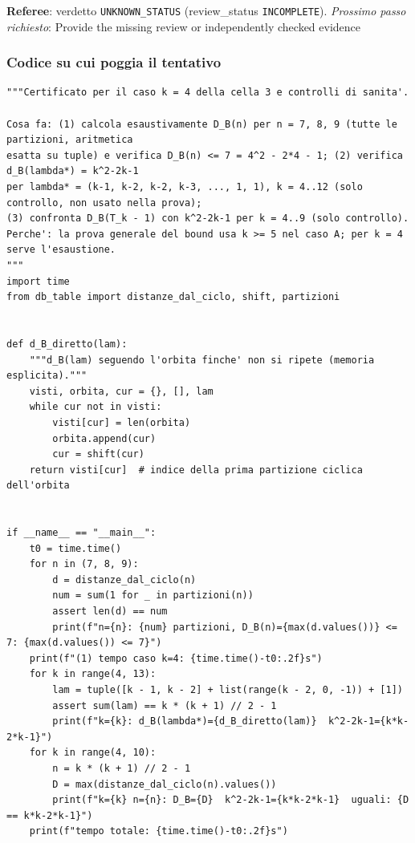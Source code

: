 \documentclass[11pt,a4paper]{article}
\begin{document}
\begin{description}
\textbf{Referee}: verdetto \texttt{UNKNOWN\_STATUS} (review\_status \texttt{INCOMPLETE}).
\emph{Prossimo passo richiesto}: Provide the missing review or independently checked evidence
\end{description}

\subsubsection{Codice su cui poggia il tentativo}
\begin{lstlisting}[caption={attempt\_001 code\_1 [python, rigore exact] — Certificato esaustivo per il caso k=4 (n = 7, 8, 9: tutte le 15+22+30 partizioni, d\_B calc — verdetto del Referee: UNKNOWN\_STATUS}]
"""Certificato per il caso k = 4 della cella 3 e controlli di sanita'.

Cosa fa: (1) calcola esaustivamente D_B(n) per n = 7, 8, 9 (tutte le partizioni, aritmetica
esatta su tuple) e verifica D_B(n) <= 7 = 4^2 - 2*4 - 1; (2) verifica d_B(lambda*) = k^2-2k-1
per lambda* = (k-1, k-2, k-2, k-3, ..., 1, 1), k = 4..12 (solo controllo, non usato nella prova);
(3) confronta D_B(T_k - 1) con k^2-2k-1 per k = 4..9 (solo controllo).
Perche': la prova generale del bound usa k >= 5 nel caso A; per k = 4 serve l'esaustione.
"""
import time
from db_table import distanze_dal_ciclo, shift, partizioni


def d_B_diretto(lam):
    """d_B(lam) seguendo l'orbita finche' non si ripete (memoria esplicita)."""
    visti, orbita, cur = {}, [], lam
    while cur not in visti:
        visti[cur] = len(orbita)
        orbita.append(cur)
        cur = shift(cur)
    return visti[cur]  # indice della prima partizione ciclica dell'orbita


if __name__ == "__main__":
    t0 = time.time()
    for n in (7, 8, 9):
        d = distanze_dal_ciclo(n)
        num = sum(1 for _ in partizioni(n))
        assert len(d) == num
        print(f"n={n}: {num} partizioni, D_B(n)={max(d.values())} <= 7: {max(d.values()) <= 7}")
    print(f"(1) tempo caso k=4: {time.time()-t0:.2f}s")
    for k in range(4, 13):
        lam = tuple([k - 1, k - 2] + list(range(k - 2, 0, -1)) + [1])
        assert sum(lam) == k * (k + 1) // 2 - 1
        print(f"k={k}: d_B(lambda*)={d_B_diretto(lam)}  k^2-2k-1={k*k-2*k-1}")
    for k in range(4, 10):
        n = k * (k + 1) // 2 - 1
        D = max(distanze_dal_ciclo(n).values())
        print(f"k={k} n={n}: D_B={D}  k^2-2k-1={k*k-2*k-1}  uguali: {D == k*k-2*k-1}")
    print(f"tempo totale: {time.time()-t0:.2f}s")

\end{lstlisting}
\end{document}
